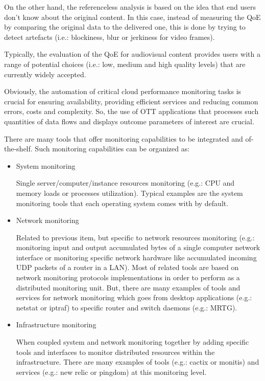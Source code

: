 On the other hand, the referenceless analysis is based on the idea that end users don't know about the original content. In this case, instead of measuring the QoE by comparing the original data to the delivered one, this is done by trying to detect artefacts (i.e.: blockiness, blur or jerkiness for video frames).

Typically, the evaluation of the QoE for audiovisual content provides users with a range of potential choices (i.e.: low, medium and high quality levels) that are currently widely accepted.

Obviously, the automation of critical cloud performance monitoring tasks is crucial for ensuring availability, providing efficient services and reducing common errors, costs and complexity. So, the use of OTT applications that processes such quantities of data flows and displays outcome parameters of interest are crucial. 

There are many tools that offer monitoring capabilities to be integrated and of-the-shelf. Such monitoring capabilities can be organized as:

\begin{itemize}
\item System monitoring \hfill

Single server/computer/instance resources monitoring (e.g.: CPU and memory loads or processes utilization). Typical examples are the system monitoring tools that each operating system comes with by default.
\item Network monitoring \hfill

Related to previous item, but specific to network resources monitoring (e.g.: monitoring input and output accumulated bytes of a single computer network interface or monitoring specific network hardware like accumulated incoming UDP packets of a router in a LAN). Most of related tools are based on network monitoring protocols implementations in order to perform as a distributed monitoring unit. But, there are many examples of tools and services for network monitoring which goes from desktop applications (e.g.: netstat or iptraf) to specific router and switch daemons (e.g.: MRTG).
\item Infrastructure monitoring \hfill

When coupled system and network monitoring together by adding specific tools and interfaces to monitor distributed resources within the infrastructure. There are many examples of tools  (e.g.: cactix or monitis) and services (e.g.: new relic or pingdom) at this monitoring level.
\end{itemize}

